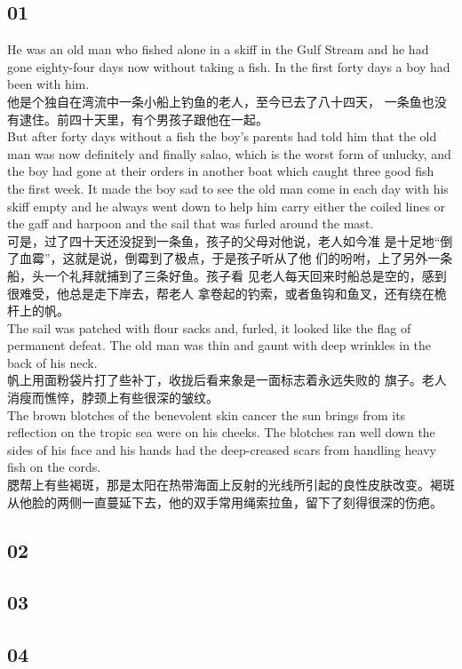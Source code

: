 \documentclass[12pt,twiside,a4paper]{ctexbook}
\numberwithin{chapter}{part}
\begin{document}
\subsection{01}
He was an old man who fished alone in a skiff in the Gulf
Stream and he had gone eighty-four days now without taking
a fish. In the first forty days a boy had been with him.\\
他是个独自在湾流中一条小船上钓鱼的老人，至今已去了八十四天，
一条鱼也没有逮住。前四十天里，有个男孩子跟他在一起。\\
But after forty days without a fish the boy's parents had told
him that the old man was now definitely and finally salao,
which is the worst form of unlucky, and the boy had gone at
their orders in another boat which caught three good fish the
first week. It made the boy sad to see the old man come in
each day with his skiff empty and he always went down to
help him carry either the coiled lines or the gaff and harpoon
and the sail that was furled around the mast.\\
可是，过了四十天还没捉到一条鱼，孩子的父母对他说，老人如今准
是十足地“倒了血霉”，这就是说，倒霉到了极点，于是孩子听从了他
们的吩咐，上了另外一条船，头一个礼拜就捕到了三条好鱼。孩子看
见老人每天回来时船总是空的，感到很难受，他总是走下岸去，帮老人
拿卷起的钓索，或者鱼钩和鱼叉，还有绕在桅杆上的帆。\\
The sail was patched with flour sacks and, furled, it looked
like the flag of permanent defeat. The old man was thin and
gaunt with deep wrinkles in the back of his neck.\\
帆上用面粉袋片打了些补丁，收拢后看来象是一面标志着永远失败的
旗子。老人消瘦而憔悴，脖颈上有些很深的皱纹。\\
The brown blotches of the benevolent skin cancer the sun
brings from its reflection on the tropic sea were on his
cheeks. The blotches ran well down the sides of his face and
his hands had the deep-creased scars from handling heavy
fish on the cords.\\
腮帮上有些褐斑，那是太阳在热带海面上反射的光线所引起的良性皮肤改变。褐斑从他脸的两侧一直蔓延下去，他的双手常用绳索拉鱼，留下了刻得很深的伤疤。
\subsection{02}

\subsection{03}
\subsection{04}
\end{document}
